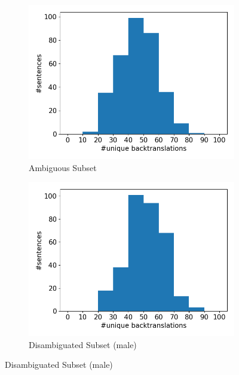 \begin{figure}[!htb]
     \centering
     
     \begin{subfigure}{0.49\textwidth}
         \centering
         \includegraphics[width=\textwidth]{figures/uniqueness/unique_back_original.png}
         \caption{Ambiguous Subset}
         \label{fig:uniqueness_ambiguous}
     \end{subfigure}
     \hfill
     \begin{subfigure}{0.49\textwidth}
         \centering
         \includegraphics[width=\textwidth]{figures/uniqueness/unique_back_male.png}
         \caption{Disambiguated Subset (male)}

\end{subfigure}
\end{figure}
